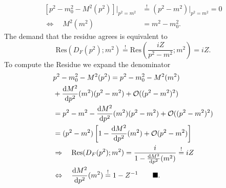 \begin{align*}
	\left[p^2-m^2_0 - M^2(p^2)\right]|_{p^2=m^2} &\stackrel{!}{=} (p^2-m^2) |_{p^2=m^2} = 0\\
	\Leftrightarrow\quad M^2(m^2) &=m^2-m^2_0.
\end{align*}
The demand that the residue agrees is equivalent to
\begin{equation*}
	\mathrm{Res}\left(D_F(p^2);m^2\right) \stackrel{!}{=} \mathrm{Res}\left(\frac{iZ}{p^2-m^2} ;m^2\right) = iZ.
\end{equation*}
To compute the Residue we expand the denominator
\begin{align*}
&	p^2-m^2_0 -M^2(p^2) = p^2-m^2_0 -M^2(m^2) \\
&+ \frac{\mathrm{d} M^2}{\mathrm{d} p^2}(m^2) (p^2-m^2) + \mathcal{O}((p^2-m^2)^2)\\
	&=p^2-m^2- \frac{\mathrm{d} M^2}{\mathrm{d} p^2} (m^2) (p^2-m^2) +\mathcal{O}((p^2-m^2)^2)\\
	&= (p^2-m^2) \left[1-\frac{\mathrm{d} M^2}{\mathrm{d} p^2} (m^2) + \mathcal{O}(p^2-m^2)\right]\\
	&\Rightarrow\quad \mathrm{Res}(D_F(p^2);m^2) = \frac{i}{1-\frac{\mathrm{d} M^2}{\mathrm{d} p^2}(m^2)} \stackrel{!}{=} iZ \\
	&\Leftrightarrow\quad \frac{\mathrm{d} M^2}{\mathrm{d} p^2}(m^2) \stackrel{!}{=} 1-Z^{-1} \qquad \blacksquare.
\end{align*}

